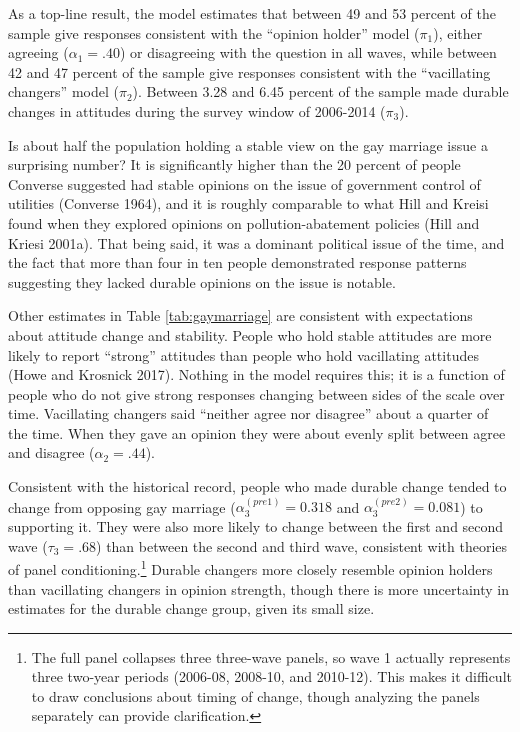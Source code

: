 \documentclass[12pt,]{article}
\begin{document}
As a top-line result, the model estimates that between 49 and 53 percent of the sample give responses consistent with the ``opinion holder'' model (\(\pi_1\)), either agreeing (\(\alpha_1 = .40\)) or disagreeing with the question in all waves, while between 42 and 47 percent of the sample give responses consistent with the ``vacillating changers'' model (\(\pi_2\)). Between 3.28 and 6.45 percent of the sample made durable changes in attitudes during the survey window of 2006-2014 (\(\pi_3\)).

Is about half the population holding a stable view on the gay marriage issue a surprising number? It is significantly higher than the 20 percent of people Converse suggested had stable opinions on the issue of government control of utilities (Converse 1964), and it is roughly comparable to what Hill and Kreisi found when they explored opinions on pollution-abatement policies (Hill and Kriesi 2001a). That being said, it was a dominant political issue of the time, and the fact that more than four in ten people demonstrated response patterns suggesting they lacked durable opinions on the issue is notable.

Other estimates in Table \ref{tab:gaymarriage} are consistent with expectations about attitude change and stability. People who hold stable attitudes are more likely to report ``strong'' attitudes than people who hold vacillating attitudes (Howe and Krosnick 2017). Nothing in the model requires this; it is a function of people who do not give strong responses changing between sides of the scale over time. Vacillating changers said ``neither agree nor disagree'' about a quarter of the time. When they gave an opinion they were about evenly split between agree and disagree (\(\alpha_2 = .44\)).

Consistent with the historical record, people who made durable change tended to change from opposing gay marriage (\(\alpha_3^{(pre1)} = 0.318\) and \(\alpha_3^{(pre2)} = 0.081\)) to supporting it. They were also more likely to change between the first and second wave (\(\tau_3 = .68\)) than between the second and third wave, consistent with theories of panel conditioning.\footnote{The full panel collapses three three-wave panels, so wave 1 actually represents three two-year periods (2006-08, 2008-10, and 2010-12). This makes it difficult to draw conclusions about timing of change, though analyzing the panels separately can provide clarification.} Durable changers more closely resemble opinion holders than vacillating changers in opinion strength, though there is more uncertainty in estimates for the durable change group, given its small size.
\end{document}

